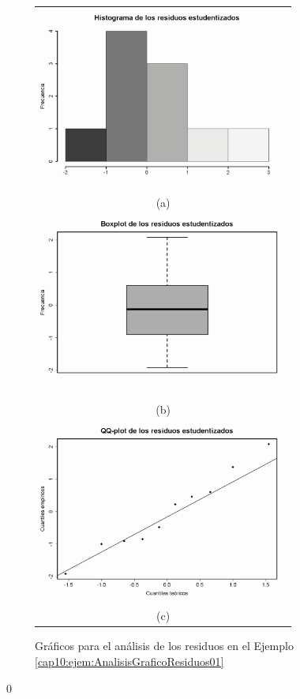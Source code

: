 \begin{ejemplo}
\begin{figure}[htbp]
\begin{center}
\begin{bn}
\begin{tabular}{c}
\includegraphics[height=6cm]{../fig/Cap10-EjemploAnalisisResiduos01-bn.png}\\
(a)\\
\includegraphics[height=6cm]{../fig/Cap10-EjemploAnalisisResiduos02-bn.png}\\
(b)\\
\includegraphics[height=6cm]{../fig/Cap10-EjemploAnalisisResiduos03-bn.png}\\
(c)
\end{tabular}
\end{bn}
\caption{Gráficos para el análisis de los residuos en el Ejemplo \ref{cap10:ejem:AnalisisGraficoResiduos01}}
\label{cap10:fig:AnalisisGraficoResiduos}
\end{center}
\end{figure}
\qed
\end{ejemplo}

